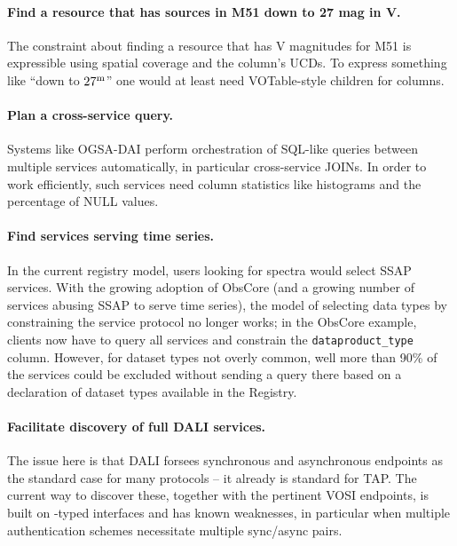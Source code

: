 \documentclass[11pt,a4paper]{ivoa}
\begin{document}
\paragraph{Find a resource that has sources in M51 down to 27 mag in V.}
The constraint about finding a resource that has V magnitudes for M51 is
expressible using spatial coverage and the column's UCDs.  To express
something like ``down to $27^{\rm m}$'' one would at least need
VOTable-style  children for columns.

\paragraph{Plan a cross-service query.} Systems like OGSA-DAI
\citep{2011ASPC..442..579H} perform orchestration of SQL-like queries
between multiple services automatically, in particular cross-service
JOINs.  In order to work efficiently, such services need column
statistics like histograms and the percentage of NULL values.

\paragraph{Find services serving time series.} In the current registry
model, users looking for spectra would select SSAP services.  With the
growing adoption of ObsCore (and a growing number of services abusing
SSAP to serve time series), the model of selecting data types by
constraining the service protocol no longer works; in the ObsCore
example, clients now have to query all services and constrain the
\verb|dataproduct_type| column. However, for dataset types not overly
common, well more than 90\% of the services could be excluded without
sending a query there based on a declaration of dataset types available
in the Registry.

\paragraph{Facilitate discovery of full DALI services.}  The issue here
is that DALI forsees synchronous and asynchronous endpoints as the
standard case for many protocols -- it already is standard for TAP.  The
current way to discover these, together with the pertinent VOSI
endpoints, is built on -typed interfaces and has
known weaknesses, in particular when multiple authentication schemes
necessitate multiple sync/async pairs.
\end{document}
